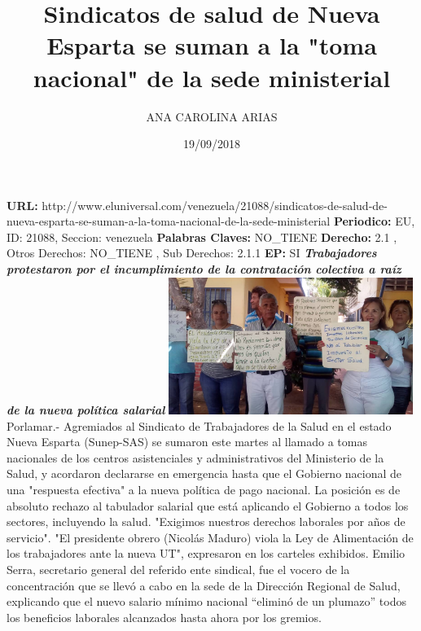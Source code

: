 \documentclass{article}%
\title{\textbf{Sindicatos de salud de Nueva Esparta se suman a la "toma nacional" de la sede ministerial}}%
\author{ANA CAROLINA ARIAS}%
\date{19/09/2018}%
\begin{document}
%
\normalsize%
\maketitle%
\textbf{URL: }%
http://www.eluniversal.com/venezuela/21088/sindicatos{-}de{-}salud{-}de{-}nueva{-}esparta{-}se{-}suman{-}a{-}la{-}toma{-}nacional{-}de{-}la{-}sede{-}ministerial\newline%
%
\textbf{Periodico: }%
EU, %
ID: %
21088, %
Seccion: %
venezuela\newline%
%
\textbf{Palabras Claves: }%
NO\_TIENE\newline%
%
\textbf{Derecho: }%
2.1%
, Otros Derechos: %
NO\_TIENE%
, Sub Derechos: %
2.1.1%
\newline%
%
\textbf{EP: }%
SI\newline%
\newline%
%
\textbf{\textit{Trabajadores protestaron por el incumplimiento de la contratación colectiva a raíz de la nueva política salarial}}%
\newline%
\newline%
%
\includegraphics[width=300px]{81.jpg}%
\newline%
%
Porlamar.{-} Agremiados al Sindicato de Trabajadores de la Salud en el estado Nueva Esparta (Sunep{-}SAS) se sumaron este martes al llamado a tomas nacionales de los centros asistenciales y administrativos del Ministerio de la Salud, y acordaron declararse en emergencia hasta que el Gobierno nacional de una "respuesta efectiva" a la nueva política de pago nacional.%
\newline%
%
La posición es de absoluto rechazo al tabulador salarial que está aplicando el Gobierno a todos los sectores, incluyendo la salud. "Exigimos nuestros derechos laborales por años de servicio". "El presidente obrero (Nicolás Maduro) viola la Ley de Alimentación  de los trabajadores  ante la nueva UT", expresaron en los carteles exhibidos.%
\newline%
%
Emilio Serra, secretario general del referido ente sindical, fue el vocero de la concentración que se llevó a cabo en la sede de la Dirección Regional de Salud, explicando que el nuevo salario mínimo nacional “eliminó de un plumazo” todos los beneficios laborales alcanzados hasta ahora por los gremios.%
\end{document}

